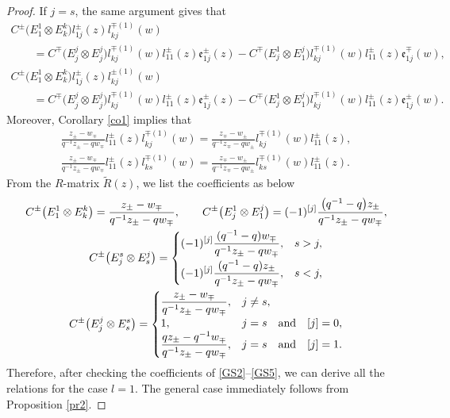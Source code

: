 \documentclass[pdftex]{sigma}
\numberwithin{equation}{section}
\begin{document}
\begin{proof}
If $j=s$, the same argument gives that
\begin{gather*} %
 C^{\pm}\bigl(E^1_1\otimes E^k_k\bigr)l_{1j}^{\pm}(z)l_{kj}^{\mp(1)}(w) \\
 \qquad=C^{\mp}\bigl(E^j_j\otimes E^j_j\bigr)l_{kj}^{\mp(1)}(w)l_{11}^{\pm}(z)\mathfrak{e}_{1j}^{\pm}(z)-C^{\mp}\bigl(E^1_j\otimes E^j_1\bigr)l_{kj}^{\mp(1)}(w)l_{11}^{\pm}(z)\mathfrak{e}_{1j}^{\mp}(w),
\\
 C^{\pm}\bigl(E^1_1\otimes E^k_k\bigr)l_{1j}^{\pm}(z)l_{kj}^{\pm(1)}(w) \\
\qquad =C^{\mp}\bigl(E^j_j\otimes E^j_j\bigr)l_{kj}^{\mp(1)}(w)l_{11}^{\pm}(z)\mathfrak{e}_{1j}^{\pm}(z)-C^{\mp}\bigl(E^1_j\otimes E^j_1\bigr)l_{kj}^{\mp(1)}(w)l_{11}^{\pm}(z)\mathfrak{e}_{1j}^{\pm}(w).
\end{gather*}
Moreover, Corollary \ref{co1} implies that
\begin{gather}
 \frac{z_{\pm}-w_{\mp}}{q^{-1}z_{\pm}-qw_{\mp}}l_{11}^{\pm}(z)l_{kj}^{\mp(1)}(w)=
 \frac{z_{\mp}-w_{\pm}}{q^{-1}z_{\mp}-qw_{\pm}}l_{kj}^{\mp(1)}(w)l_{11}^{\pm}(z),\nonumber\\
 \frac{z_{\pm}-w_{\mp}}{q^{-1}z_{\pm}-qw_{\mp}}l_{11}^{\pm}(z)l_{ks}^{\mp(1)}(w)=
 \frac{z_{\mp}-w_{\pm}}{q^{-1}z_{\mp}-qw_{\pm}}l_{ks}^{\mp(1)}(w)l_{11}^{\pm}(z).\label{GS5}
\end{gather}
From the $R$-matrix $\widetilde{R}(z)$, we list the coefficients as below
\begin{gather*}
 C^{\pm}\bigl(E^1_1\otimes E^k_k\bigr)=\frac{z_{\pm}-w_{\mp}}{q^{-1}z_{\pm}-qw_{\mp}}, \qquad
 C^{\pm}\bigl(E^1_j\otimes E^j_1\bigr)=(-1)^{[j]}\frac{\bigl(q^{-1}-q\bigr)z_{\pm}}{q^{-1}z_{\pm}-qw_{\mp}},
\\
 C^{\pm}\bigl(E^s_j\otimes E^j_s\bigr)=
 \begin{cases}
\displaystyle (-1)^{[j]}\frac{(q^{-1}-q)w_{\mp}}{q^{-1}z_{\pm}-qw_{\mp}},&s>j,\vspace{1mm}\\
 \displaystyle(-1)^{[j]}\frac{(q^{-1}-q)z_{\pm}}{q^{-1}z_{\pm}-qw_{\mp}},&s<j, \end{cases}
\\
 C^{\pm}\bigl(E^j_j\otimes E^s_s\bigr)=
 \begin{cases}
 \displaystyle \frac{z_{\pm}-w_{\mp}}{q^{-1}z_{\pm}-qw_{\mp}},&j\neq s,\\
 1,&j=s\quad \text{and} \quad[j]=0,\\
 \displaystyle \frac{qz_{\pm}-q^{-1}w_{\mp}}{q^{-1}z_{\pm}-qw_{\mp}},&j=s\quad \text{and} \quad[j]=1. \end{cases}
\end{gather*}
Therefore, after checking the coefficients of \eqref{GS2}--\eqref{GS5}, we can derive all the relations for the case $l=1$. The general case immediately follows from Proposition \ref{pr2}.
\end{proof}
\end{document}
